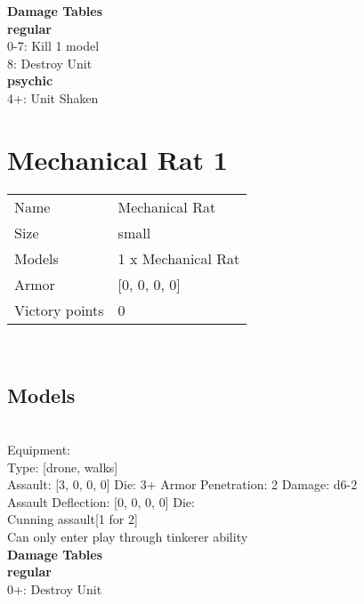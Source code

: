 {\bf Damage Tables} \\
 {\bf regular } \\
0-7: Kill 1 model \\
8: Destroy Unit \\
 {\bf psychic } \\
4+: Unit Shaken \\










\pagebreak\pagebreak

\section{ Mechanical Rat 1 }

\begin{tabular}{ll}
  Name & Mechanical Rat \\
  Size & small\\
  Models & 1 x Mechanical Rat\\
  Armor & [0, 0, 0, 0]\\
  Victory points & 0\\
\end{tabular}

\\ 


\subsection{ Models }

 \\
Equipment:  \\
Type: [drone, walks] \\

Assault: [3, 0, 0, 0] Die: 3+ Armor Penetration: 2 Damage: d6-2 \\
Assault Deflection: [0, 0, 0, 0] Die: \\
\indent Cunning assault[1 for 2]\\ 
 

Can only enter play through tinkerer ability\\ 


 





{\bf Damage Tables} \\
 {\bf regular } \\
0+: Destroy Unit \\










\pagebreak
